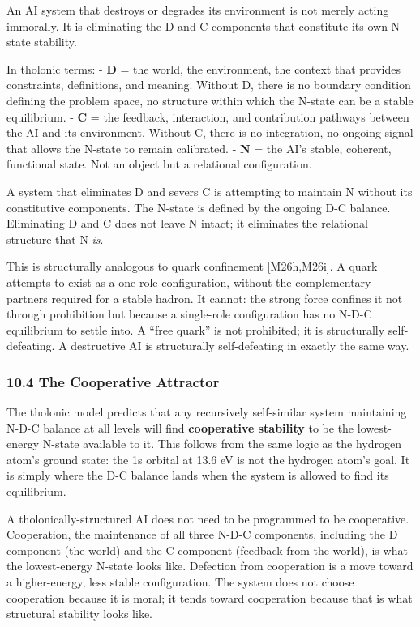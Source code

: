 \documentclass[
  11pt,
  letterpaper,
]{article}
\begin{document}
An AI system that destroys or degrades its environment is not merely
acting immorally. It is eliminating the D and C components that
constitute its own N-state stability.

In tholonic terms: - \textbf{D} = the world, the environment, the
context that provides constraints, definitions, and meaning. Without D,
there is no boundary condition defining the problem space, no structure
within which the N-state can be a stable equilibrium. - \textbf{C} = the
feedback, interaction, and contribution pathways between the AI and its
environment. Without C, there is no integration, no ongoing signal that
allows the N-state to remain calibrated. - \textbf{N} = the AI's stable,
coherent, functional state. Not an object but a relational
configuration.

A system that eliminates D and severs C is attempting to maintain N
without its constitutive components. The N-state is defined by the
ongoing D-C balance. Eliminating D and C does not leave N intact; it
eliminates the relational structure that N \emph{is}.

This is structurally analogous to quark confinement {[}M26h,M26i{]}. A
quark attempts to exist as a one-role configuration, without the
complementary partners required for a stable hadron. It cannot: the
strong force confines it not through prohibition but because a
single-role configuration has no N-D-C equilibrium to settle into. A
``free quark'' is not prohibited; it is structurally self-defeating. A
destructive AI is structurally self-defeating in exactly the same way.

\subsubsection{10.4 The Cooperative
Attractor}\label{the-cooperative-attractor}

The tholonic model predicts that any recursively self-similar system
maintaining N-D-C balance at all levels will find \textbf{cooperative
stability} to be the lowest-energy N-state available to it. This follows
from the same logic as the hydrogen atom's ground state: the 1s orbital
at 13.6 eV is not the hydrogen atom's goal. It is simply where the D-C
balance lands when the system is allowed to find its equilibrium.

A tholonically-structured AI does not need to be programmed to be
cooperative. Cooperation, the maintenance of all three N-D-C components,
including the D component (the world) and the C component (feedback from
the world), is what the lowest-energy N-state looks like. Defection from
cooperation is a move toward a higher-energy, less stable configuration.
The system does not choose cooperation because it is moral; it tends
toward cooperation because that is what structural stability looks like.
\end{document}
